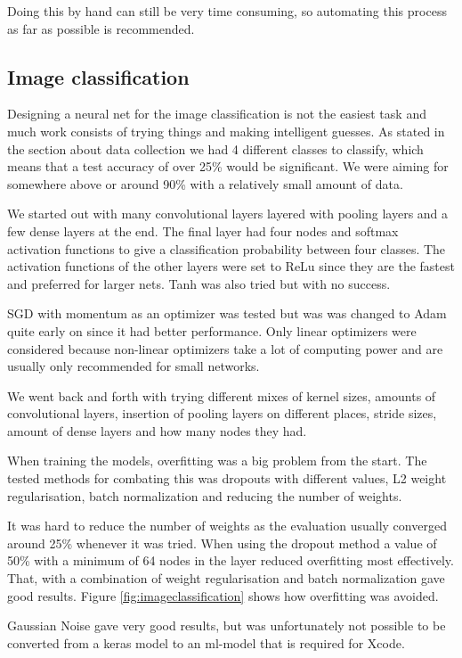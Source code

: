 Doing this by hand can still be very time consuming, so automating this process as far as possible is recommended.

\subsection{Image classification}
Designing a neural net for the image classification is not the easiest task and much
work consists of trying things and making intelligent guesses.
As stated in the section about data collection we had 4 different classes to classify,
which means that a test accuracy of over 25\% would be significant. We were aiming for
somewhere above or around 90\% with a relatively small amount of data.

We started out with many convolutional layers layered with pooling layers and a few dense
layers at the end. The final layer had four nodes and softmax activation functions to give a
classification probability between four classes.
The activation functions of the other layers were set to ReLu since they are the fastest
and preferred for larger nets. Tanh was also tried but with no success.

SGD with momentum as an optimizer was tested but was was changed to Adam
quite early on since it had better performance.
Only linear optimizers were considered because non-linear optimizers take a lot of
computing power and are usually only recommended for small networks.

We went back and forth with trying different mixes of kernel sizes, amounts of convolutional
layers, insertion of pooling layers on different places, stride sizes, amount of dense layers
and how many nodes they had.

When training the models, overfitting was a big problem from the start. The tested methods
for combating this was dropouts with different values, L2 weight regularisation,
batch normalization and reducing the number of weights.

It was hard to reduce the number of weights as the evaluation usually converged around 25\%
whenever it was tried.
When using the dropout method a value of 50\% with a minimum of 64 nodes in the layer
reduced overfitting most effectively. That, with a combination of weight regularisation and batch 
normalization gave good results. Figure \ref{fig:imageclassification} shows how overfitting was avoided.

Gaussian Noise gave very good results, but was unfortunately not possible to be 
converted from a keras model to an ml-model that is required for Xcode.

